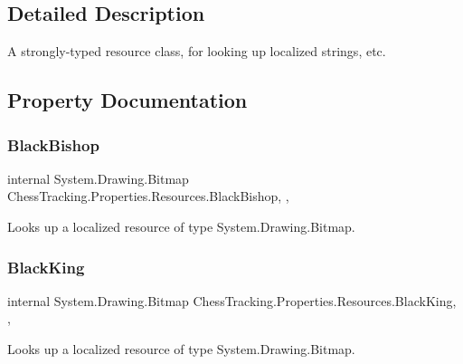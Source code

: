 \subsection{Detailed Description}
A strongly-\/typed resource class, for looking up localized strings, etc. 



\subsection{Property Documentation}
\mbox{\label{class_chess_tracking_1_1_properties_1_1_resources_a7e82e89469298b5551960365a6a7554e}} 
\subsubsection{\texorpdfstring{BlackBishop}{BlackBishop}}
{\footnotesize\ttfamily internal System.\+Drawing.\+Bitmap Chess\+Tracking.\+Properties.\+Resources.\+Black\+Bishop\hspace{0.3cm}{\ttfamily [static]}, {\ttfamily [get]}, {\ttfamily [private]}}



Looks up a localized resource of type System.\+Drawing.\+Bitmap. 

\mbox{\label{class_chess_tracking_1_1_properties_1_1_resources_a52ea8aebc2d43137b4c83661a7105377}} 
\subsubsection{\texorpdfstring{BlackKing}{BlackKing}}
{\footnotesize\ttfamily internal System.\+Drawing.\+Bitmap Chess\+Tracking.\+Properties.\+Resources.\+Black\+King\hspace{0.3cm}{\ttfamily [static]}, {\ttfamily [get]}, {\ttfamily [private]}}



Looks up a localized resource of type System.\+Drawing.\+Bitmap. 

